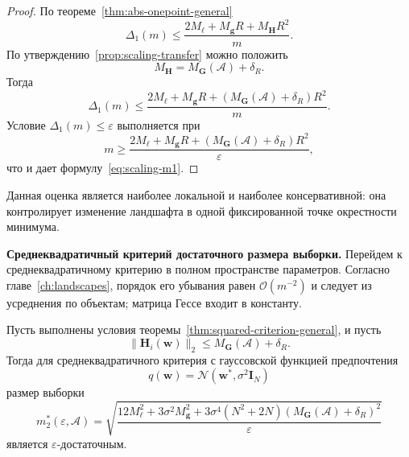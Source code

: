 \begin{proof}
    По теореме~\ref{thm:abs-onepoint-general}
    \begin{equation}
        \Delta_1(m)
        \le
        \frac{
            2M_{\ell}
            +
            M_{\mathbf g}R
            +
            M_{\mathbf H}R^2
        }{m}.
    \end{equation}
    По утверждению~\ref{prop:scaling-transfer} можно положить
    \begin{equation}
        M_{\mathbf H}=M_{\mathbf G}(\mathcal A)+\delta_R.
    \end{equation}
    Тогда
    \begin{equation}
        \Delta_1(m)
        \le
        \frac{
            2M_{\ell}
            +
            M_{\mathbf g}R
            +
            \left(M_{\mathbf G}(\mathcal A)+\delta_R\right)R^2
        }{m}.
    \end{equation}
    Условие $\Delta_1(m)\le\varepsilon$ выполняется при
    \begin{equation}
        m
        \ge
        \frac{
            2M_{\ell}
            +
            M_{\mathbf g}R
            +
            \left(M_{\mathbf G}(\mathcal A)+\delta_R\right)R^2
        }{\varepsilon},
    \end{equation}
    что и дает формулу~\eqref{eq:scaling-m1}.
\end{proof}

Данная оценка является наиболее локальной и наиболее консервативной: она контролирует изменение ландшафта в одной фиксированной точке окрестности минимума.

\textbf{Среднеквадратичный критерий достаточного размера выборки.} Перейдем к среднеквадратичному критерию в полном пространстве параметров. Согласно главе~\ref{ch:landscapes}, порядок его убывания равен $\mathcal O(m^{-2})$ и следует из усреднения по объектам; матрица Гессе входит в константу.

\begin{theorem}
    \label{thm:scaling-sufficient-squared}
    Пусть выполнены условия теоремы~\ref{thm:squared-criterion-general}, и пусть
    \begin{equation}
        \|\mathbf H_i(\mathbf w)\|_2
        \le
        M_{\mathbf G}(\mathcal A)+\delta_R.
    \end{equation}
    Тогда для среднеквадратичного критерия с гауссовской функцией предпочтения
    \begin{equation}
        q(\mathbf w)=\mathcal N(\mathbf w^*, \sigma^2\mathbf I_N)
    \end{equation}
    размер выборки
    \begin{equation}
        \label{eq:scaling-m2}
        m_2^*(\varepsilon, \mathcal A)
        =
        \sqrt{
            \frac{
                12M_{\ell}^2
                +
                3\sigma^2 M_{\mathbf g}^2
                +
                3\sigma^4(N^2+2N)\left(M_{\mathbf G}(\mathcal A)+\delta_R\right)^2
            }{\varepsilon}
        }
    \end{equation}
    является $\varepsilon$-достаточным.
\end{theorem}

